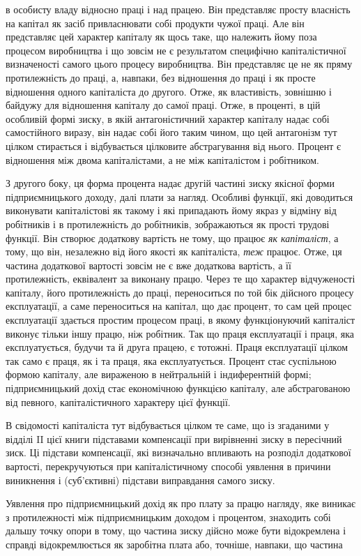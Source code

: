 \parcont{}  %
в особисту владу відносно праці і над працею. Він представляє
просту власність на капітал як засіб привласнювати собі продукти
чужої праці. Але він представляє цей характер капіталу як
щось таке, що належить йому поза процесом виробництва і що
зовсім не є результатом специфічно капіталістичної визначеності
самого цього процесу виробництва. Він представляє це не як
пряму протилежність до праці, а, навпаки, без відношення до
праці і як просте відношення одного капіталіста до другого.
Отже, як властивість, зовнішню і байдужу для відношення капіталу
до самої праці. Отже, в проценті, в цій особливій формі
зиску, в якій антагоністичний характер капіталу надає собі самостійного
виразу, він надає собі його таким чином, що цей антагонізм
тут цілком стирається і відбувається цілковите абстрагування
від нього. Процент є відношення між двома капіталістами,
а не між капіталістом і робітником.

З другого боку, ця форма процента надає другій частині
зиску якісної форми підприємницького доходу, далі плати за
нагляд. Особливі функції, які доводиться виконувати капіталістові
як такому і які припадають йому якраз у відміну від робітників
і в протилежність до робітників, зображаються як прості трудові
функції. Він створює додаткову вартість не тому, що працює
\emph{як капіталіст}, а тому, що він, незалежно від його якості як
капіталіста, \emph{теж} працює. Отже, ця частина додаткової вартості
зовсім не є вже додаткова вартість, а її протилежність, еквівалент
за виконану працю. Через те що характер відчуженості капіталу,
його протилежність до праці, переноситься по той бік дійсного
процесу експлуатації, а саме переноситься на капітал, що дає
процент, то сам цей процес експлуатації здається простим процесом
праці, в якому функціонуючий капіталіст виконує тільки
іншу працю, ніж робітник. Так що праця експлуатації і праця, яка
експлуатується, будучи та й друга працею, є тотожні. Праця
експлуатації цілком так само є праця, як і та праця, яка експлуатується.
Процент стає суспільною формою капіталу, але вираженою
в нейтральній і індиферентній формі; підприємницький
дохід стає економічною функцією капіталу, але абстрагованою
від певного, капіталістичного характеру цієї функції.

В свідомості капіталіста тут відбувається цілком те саме,
що із згаданими у відділі II цієї книги підставами компенсації
при вирівненні зиску в пересічний зиск. Ці підстави компенсації,
які визначально впливають на розподіл додаткової вартості,
перекручуються при капіталістичному способі уявлення
в причини виникнення і (суб’єктивні) підстави виправдання самого
зиску.

Уявлення про підприємницький дохід як про плату за працю
нагляду, яке виникає з протилежності між підприємницьким доходом
і процентом, знаходить собі дальшу точку опори в тому, що
частина зиску дійсно може бути відокремлена і справді відокремлюється
як заробітна плата або, точніше, навпаки, що частина
\parbreak{}  %

